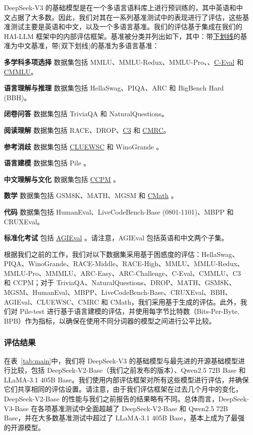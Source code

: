 \documentclass[lang=cn,a4paper,newtx]{elegantpaper}
\newcommand{\dsvii}{DeepSeek-V2}
\newcommand{\dsviii}{DeepSeek-V3}
\begin{document}
\dsviii{} 的基础模型是在一个多语言语料库上进行预训练的，其中英语和中文占据了大多数。因此，我们对其在一系列基准测试中的表现进行了评估，这些基准测试主要是英语和中文，以及一个多语言基准。我们的评估基于集成在我们的 HAI-LLM 框架中的内部评估框架。基准被分类并列出如下，其中：带\underline{下划线}的基准为中文基准，带\uuline(双下划线)的基准为多语言基准：

\textbf{多学科多项选择} 数据集包括 MMLU、MMLU-Redux、MMLU-Pro、、\underline{C-Eval} 和 \underline{CMMLU}。

\textbf{语言理解与推理} 数据集包括 HellaSwag、PIQA、ARC 和 BigBench Hard (BBH)。

\textbf{闭卷问答} 数据集包括 TriviaQA 和 NaturalQuestions。

\textbf{阅读理解} 数据集包括 RACE、DROP、\underline{C3} 和 \underline{CMRC}。

\textbf{参考消歧} 数据集包括 \underline{CLUEWSC} 和 WinoGrande 。

\textbf{语言建模} 数据集包括 Pile 。

\textbf{中文理解与文化} 数据集包括 \underline{CCPM} 。

\textbf{数学} 数据集包括 GSM8K、MATH、MGSM 和 \underline{CMath} 。

\textbf{代码} 数据集包括 HumanEval、LiveCodeBench-Base (0801-1101)、MBPP 和 CRUXEval。

\textbf{标准化考试} 包括 \underline{AGIEval} 。请注意，AGIEval 包括英语和中文两个子集。

根据我们之前的工作，我们对以下数据集采用基于困惑度的评估：HellaSwag、PIQA、WinoGrande、RACE-Middle、RACE-High、MMLU、MMLU-Redux、MMLU-Pro、MMMLU、ARC-Easy、ARC-Challenge、C-Eval、CMMLU、C3 和 CCPM；对于 TriviaQA、NaturalQuestions、DROP、MATH、GSM8K、MGSM、HumanEval、MBPP、LiveCodeBench-Base、CRUXEval、BBH、AGIEval、CLUEWSC、CMRC 和 CMath，我们采用基于生成的评估。此外，我们对 Pile-test 进行基于语言建模的评估，并使用每字节比特数（Bits-Per-Byte, BPB）作为指标，以确保在使用不同分词器的模型之间进行公平比较。



\subsubsection{评估结果}

在表~\ref{tab:main}中，我们将 \dsviii{} 的基础模型与最先进的开源基础模型进行比较，包括 \dsvii{}-Base（我们之前发布的版本）、Qwen2.5 72B Base 和 LLaMA-3.1 405B Base。我们使用内部评估框架对所有这些模型进行评估，并确保它们共享相同的评估设置。请注意，由于我们评估框架在过去几个月中的变化，\dsvii{}-Base 的性能与我们之前报告的结果略有不同。总体而言，\dsviii{}-Base 在各项基准测试中全面超越了 \dsvii{}-Base 和 Qwen2.5 72B Base，并在大多数基准测试中超过了 LLaMA-3.1 405B Base，基本上成为了最强的开源模型。
\end{document}
